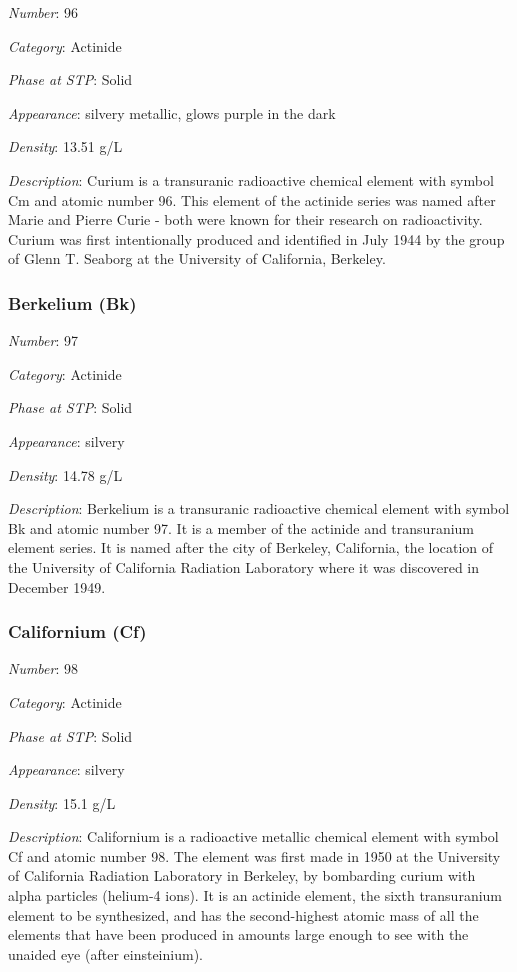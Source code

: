 \documentclass{article}
\begin{document}
\textit{Number}: 96

\textit{Category}: Actinide

\textit{Phase at STP}: Solid

\textit{Appearance}: silvery metallic, glows purple in the dark

\textit{Density}: 13.51 g/L

\textit{Description}: Curium is a transuranic radioactive chemical element with symbol Cm and atomic number 96. This element of the actinide series was named after Marie and Pierre Curie - both were known for their research on radioactivity. Curium was first intentionally produced and identified in July 1944 by the group of Glenn T. Seaborg at the University of California, Berkeley.

\hypertarget{subsubsection::Bk}{}\subsubsection{Berkelium (Bk)}

\textit{Number}: 97

\textit{Category}: Actinide

\textit{Phase at STP}: Solid

\textit{Appearance}: silvery

\textit{Density}: 14.78 g/L

\textit{Description}: Berkelium is a transuranic radioactive chemical element with symbol Bk and atomic number 97. It is a member of the actinide and transuranium element series. It is named after the city of Berkeley, California, the location of the University of California Radiation Laboratory where it was discovered in December 1949.

\hypertarget{subsubsection::Cf}{}\subsubsection{Californium (Cf)}

\textit{Number}: 98

\textit{Category}: Actinide

\textit{Phase at STP}: Solid

\textit{Appearance}: silvery

\textit{Density}: 15.1 g/L

\textit{Description}: Californium is a radioactive metallic chemical element with symbol Cf and atomic number 98. The element was first made in 1950 at the University of California Radiation Laboratory in Berkeley, by bombarding curium with alpha particles (helium-4 ions). It is an actinide element, the sixth transuranium element to be synthesized, and has the second-highest atomic mass of all the elements that have been produced in amounts large enough to see with the unaided eye (after einsteinium).
\end{document}
